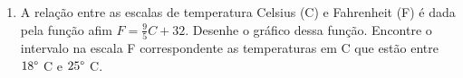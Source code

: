 \documentclass[a4paper,5pt]{amsbook}
\newcommand{\ds}{\displaystyle}
\newcommand{\ra}{\rightarrow}
\begin{document}
\begin{enumerate}
    \vspace{0.5cm}
    \item A rela\c{c}\~ao entre as escalas de temperatura Celsius (C) e Fahrenheit
        (F) \'e dada pela fun\c{c}\~ao afim $F=\displaystyle\frac{9}{5}C+32$. Desenhe o
        gr\'afico dessa fun\c{c}\~ao. Encontre o intervalo na escala F correspondente
        as temperaturas em C que est\~ao entre $18\degree$ C e $25\degree$ C.

%
%

\end{enumerate}
\end{document}
